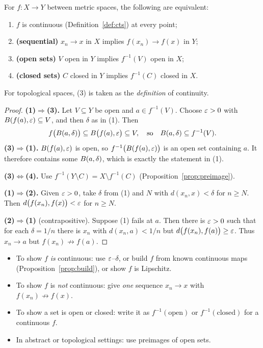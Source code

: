 \begin{theorem}\label{thm:cts-equiv}
For $f\colon X\to Y$ between metric spaces, the following are equivalent:
\begin{enumerate}[label=(\arabic*)]
  \item $f$ is continuous (Definition~\ref{def:cts}) at every point;
  \item \textbf{(sequential)} $x_n\to x$ in $X$ implies $f(x_n)\to f(x)$ in $Y$;
  \item \textbf{(open sets)} $V$ open in $Y$ implies $f^{-1}(V)$ open in $X$;
  \item \textbf{(closed sets)} $C$ closed in $Y$ implies $f^{-1}(C)$ closed in $X$.
\end{enumerate}
For topological spaces, (3) is taken as the \emph{definition} of continuity.
\end{theorem}
\begin{proof}
\textbf{(1)$\Rightarrow$(3).} Let $V\subseteq Y$ be open and $a\in f^{-1}(V)$. Choose $\varepsilon>0$ with $B(f(a),\varepsilon)\subseteq V$, and then $\delta$ as in (1). Then
\[
  f\bigl(B(a,\delta)\bigr)\subseteq B\bigl(f(a),\varepsilon\bigr)\subseteq V,
  \quad\text{so}\quad B(a,\delta)\subseteq f^{-1}(V).
\]
\textbf{(3)$\Rightarrow$(1).} $B(f(a),\varepsilon)$ is open, so $f^{-1}\bigl(B(f(a),\varepsilon)\bigr)$ is an open set containing $a$. It therefore contains some $B(a,\delta)$, which is exactly the statement in (1).

\textbf{(3)$\Leftrightarrow$(4).} Use $f^{-1}(Y\setminus C)=X\setminus f^{-1}(C)$ (Proposition~\ref{prop:preimage}).

\textbf{(1)$\Rightarrow$(2).} Given $\varepsilon>0$, take $\delta$ from (1) and $N$ with $d(x_n,x)<\delta$ for $n\ge N$. Then $d\bigl(f(x_n),f(x)\bigr)<\varepsilon$ for $n\ge N$.

\textbf{(2)$\Rightarrow$(1)} (contrapositive). Suppose (1) fails at $a$. Then there is $\varepsilon>0$ such that for each $\delta=1/n$ there is $x_n$ with $d(x_n,a)<1/n$ but $d\bigl(f(x_n),f(a)\bigr)\ge\varepsilon$. Thus $x_n\to a$ but $f(x_n)\not\to f(a)$.
\end{proof}

\begin{examtip}
\leavevmode
\begin{itemize}
  \item To show $f$ \emph{is} continuous: use $\varepsilon$--$\delta$, or build $f$ from known continuous maps (Proposition~\ref{prop:build}), or show $f$ is Lipschitz.
  \item To show $f$ is \emph{not} continuous: give \emph{one} sequence $x_n\to x$ with $f(x_n)\not\to f(x)$.
  \item To show a set is open or closed: write it as $f^{-1}(\text{open})$ or $f^{-1}(\text{closed})$ for a continuous $f$.
  \item In abstract or topological settings: use preimages of open sets.
\end{itemize}
\end{examtip}

